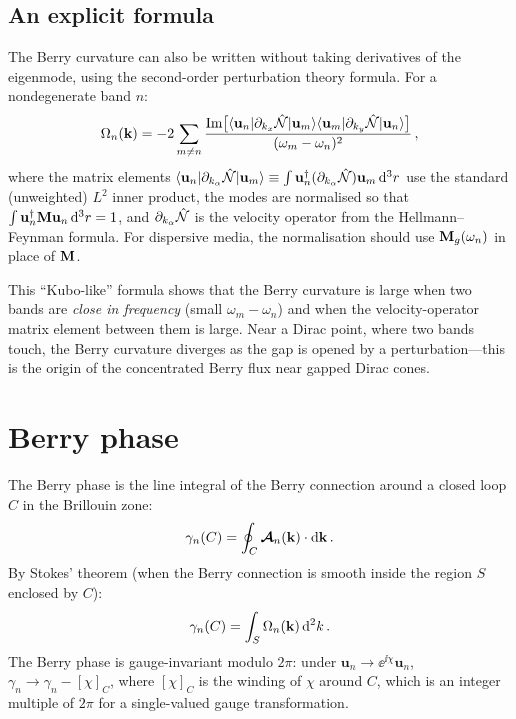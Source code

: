 \subsection{An explicit formula}
\label{sec:ch5-curvature-explicit}

The Berry curvature can also be written without taking derivatives of
the eigenmode, using the second-order perturbation theory formula.
For a nondegenerate band $n$:
\begin{equation}\label{eq:ch5-kubo-formula}
  \Omega_n(\mathbf{k})
  = -2\sum_{m\neq n}
  \frac{
    \mathrm{Im}\bigl[
      \langle\mathbf{u}_n|\partial_{k_x}\hat{\mathcal{N}}|\mathbf{u}_m\rangle
      \langle\mathbf{u}_m|\partial_{k_y}\hat{\mathcal{N}}|\mathbf{u}_n\rangle
    \bigr]
  }{
    (\omega_m-\omega_n)^2
  }\,,
\end{equation}
where the matrix elements
$\langle\mathbf{u}_n|\partial_{k_\alpha}\hat{\mathcal{N}}|\mathbf{u}_m\rangle
\equiv\int\mathbf{u}_n^\dagger(\partial_{k_\alpha}\hat{\mathcal{N}})\mathbf{u}_m\,\mathrm{d}^3r$
use the standard (unweighted) $L^2$ inner product, the modes are
normalised so that $\int\mathbf{u}_n^\dagger\mathbf{M}\mathbf{u}_n\,\mathrm{d}^3r=1$,
and $\partial_{k_\alpha}\hat{\mathcal{N}}$ is the velocity operator from the
Hellmann--Feynman formula.  For dispersive media, the normalisation
should use $\mathbf{M}_g(\omega_n)$ in place of $\mathbf{M}$.

This ``Kubo-like'' formula shows that the Berry curvature is large when
two bands are \emph{close in frequency} (small $\omega_m-\omega_n$) and
when the velocity-operator matrix element between them is large.  Near a
Dirac point, where two bands touch, the Berry curvature diverges as the
gap is opened by a perturbation---this is the origin of the concentrated
Berry flux near gapped Dirac cones.

\section{Berry phase}
\label{sec:ch5-berry-phase}

The Berry phase is the line integral of the Berry connection around a
closed loop $C$ in the Brillouin zone:
\begin{equation}\label{eq:ch5-berry-phase}
  \gamma_n(C) = \oint_C \boldsymbol{\mathcal{A}}_n(\mathbf{k})\cdot\mathrm{d}\mathbf{k}\,.
\end{equation}
By Stokes' theorem (when the Berry connection is smooth inside the
region $S$ enclosed by $C$):
\begin{equation}\label{eq:ch5-berry-stokes}
  \gamma_n(C) = \int_S \Omega_n(\mathbf{k})\,\mathrm{d}^2 k\,.
\end{equation}
The Berry phase is gauge-invariant modulo $2\pi$: under
$\mathbf{u}_n\to\ee^{\ii\chi}\mathbf{u}_n$, $\gamma_n\to\gamma_n-[\chi]_C$,
where $[\chi]_C$ is the winding of $\chi$ around $C$, which is an
integer multiple of $2\pi$ for a single-valued gauge transformation.

